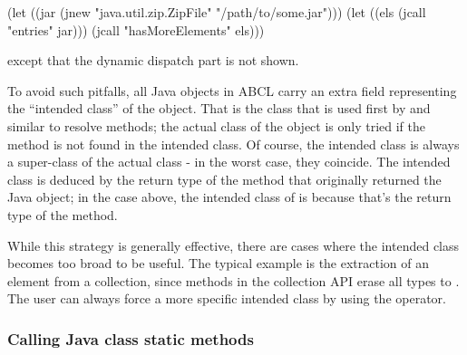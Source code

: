 \documentclass[10pt]{book}
\begin{document}
\begin{listing-lisp}
(let ((jar (jnew "java.util.zip.ZipFile" "/path/to/some.jar")))
  (let ((els (jcall "entries" jar)))
    (jcall "hasMoreElements" els)))
\end{listing-lisp}

except that the dynamic dispatch part is not shown.

To avoid such pitfalls, all Java objects in \textsc{ABCL} carry an extra
field representing the ``intended class'' of the object. That is the class
that is used first by  and similar to resolve methods;
the actual class of the object is only tried if the method is not found
in the intended class. Of course, the intended class is always a super-class
of the actual class - in the worst case, they coincide. The intended class
is deduced by the return type of the method that originally returned
the Java object; in the case above, the intended class of 
is  because that's the return type of
the  method.

While this strategy is generally effective, there are cases where the
intended class becomes too broad to be useful. The typical example
is the extraction of an element from a collection, since methods in
the collection API erase all types to . The user can
always force a more specific intended class by using the 
operator.


\subsubsection{Calling Java class static methods}
\end{document}
